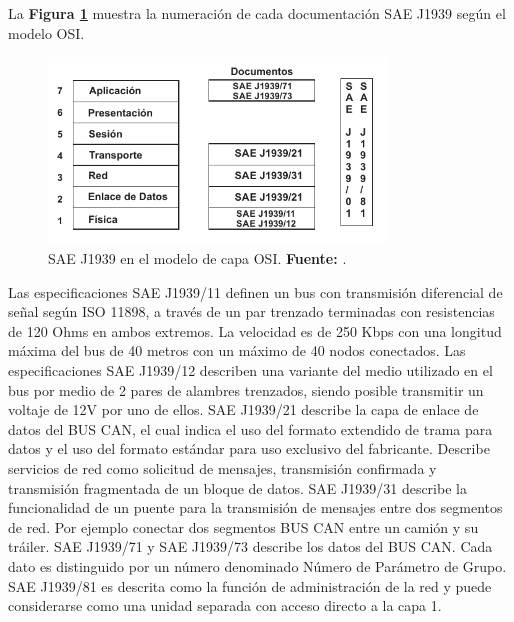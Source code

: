 La \textbf{Figura \ref{osij}} muestra la numeración de cada documentación SAE J1939 según el modelo OSI.


\begin{figure}[H]
	\centering
		\includegraphics[width=0.8\textwidth]{./Cap3imagen/OSIJ1939.pdf}
	\caption[SAE J1939 en el modelo de capa OSI.]{SAE J1939 en el modelo de capa OSI.\textbf{ Fuente:} \cite{EPCAN}.}
	\label{osij} %
\end{figure}

Las especificaciones SAE J1939/11 definen un bus con transmisión diferencial de señal según ISO 11898, a través de un par trenzado terminadas con resistencias de 120 Ohms en ambos extremos. La velocidad es de 250 Kbps con una longitud máxima del bus de 40 metros con un máximo de 40 nodos conectados.
Las especificaciones SAE J1939/12 describen una variante del medio utilizado en el bus por medio de 2 pares de alambres trenzados, siendo posible transmitir un voltaje de 12V por uno de ellos.
SAE J1939/21 describe la capa de enlace de datos del BUS CAN, el cual indica el uso del formato extendido de trama para datos y el uso del formato estándar para uso exclusivo del fabricante. Describe servicios de red como solicitud de mensajes, transmisión confirmada y transmisión fragmentada de un bloque de datos.
SAE J1939/31 describe la funcionalidad de un puente para la transmisión de mensajes entre dos segmentos de red. Por ejemplo conectar dos segmentos BUS CAN entre un camión y su tráiler.
SAE J1939/71 y SAE J1939/73 describe los datos del BUS CAN. Cada dato es distinguido por un número denominado Número de Parámetro de Grupo.
SAE J1939/81 es descrita como la función de administración de la red y puede considerarse como una unidad separada con acceso directo a la capa 1. 


